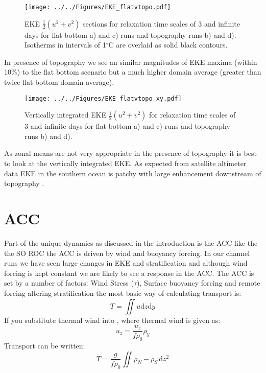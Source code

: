 \begin{figure}[H]
\noindent \texttt{[image: ../../Figures/EKE\_flatvtopo.pdf]} 
\caption{EKE $\frac{1}{2}(u^2 + v^2)$ sections for relaxation time scales of 3 and infinite days for flat bottom a) and c) runs and topography runs b) and d). Isotherms in intervals of 1$^{\circ}$C are overlaid as solid black contours.}
\label{fig:EKE_full}
\end{figure}
In presence of topography we see an similar magnitudes of EKE maxima (within 10\%) to the flat bottom scenario but a much higher domain average (greater than twice flat bottom domain average).
\begin{figure}[H]
\noindent \texttt{[image: ../../Figures/EKE\_flatvtopo\_xy.pdf]} 
\caption{Vertically integrated EKE $\frac{1}{2}(u^2 + v^2)$ for relaxation time scales of 3 and infinite days for flat bottom a) and c) runs and topography runs b) and d).}
\label{fig:EKExy}
\end{figure}
As zonal means are not very appropriate in the presence of topography it is best to look at the vertically integrated EKE. As  expected from satellite altimeter data EKE in the southern ocean is patchy with large enhancement downstream of topography \citep{Thompson2008}.


\section{ACC}
Part of the unique dynamics as discussed in the introduction is the \gls{ACC} like the the SO ROC the ACC is driven by wind and buoyancy forcing. In our channel runs we have seen large changes in EKE and stratification and although wind forcing is kept constant we are likely to see a response in the ACC.
The ACC is set by a number of factors: Wind Stress ($\tau$), Surface buoyancy forcing and remote forcing altering stratification the most basic way of calculating transport is:
\begin{equation}
T=\iint u \mathrm{d}z\mathrm{d}y
\label{eq:transport}
\end{equation}
If you substitute thermal wind into , where thermal wind is given as:
\begin{equation}
u_z=\frac{u_z}{f\rho_0}\rho_y
\label{eq:thermalwind}
\end{equation}
Transport can be written:
\begin{equation}
T=\frac{g}{f\rho_0}\iint \rho_N -\rho_S \, \mathrm{d}z^2
\label{eq:transport2}
\end{equation}

